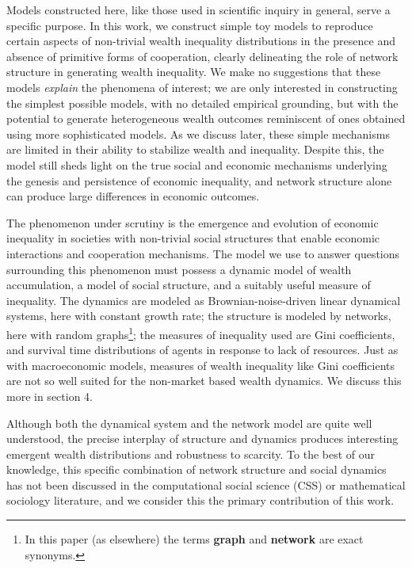 Models constructed here, like those used in scientific inquiry in general, serve a specific purpose. In this work, we construct simple toy models to reproduce certain aspects of non-trivial wealth inequality distributions in the presence and absence of primitive forms of cooperation, clearly delineating the role of network structure in generating wealth inequality. We make no suggestions that these models \textit{explain} the phenomena of interest; we are only interested in constructing the simplest possible models, with no detailed empirical grounding, but with the potential to generate heterogeneous wealth outcomes reminiscent of ones obtained using more sophisticated models. As we discuss later, these simple mechanisms are limited in their ability to stabilize wealth and inequality. Despite this, the model still sheds light on the true social and economic mechanisms underlying the genesis and persistence of economic inequality, and network structure alone can produce large differences in economic outcomes. 


\label{giniKindaSucks}
The phenomenon under scrutiny is the emergence and evolution of economic inequality in societies with non-trivial social structures that enable economic interactions and cooperation mechanisms. The model we use to answer questions surrounding this phenomenon must possess a dynamic model of wealth accumulation, a model of social structure, and a suitably useful measure of inequality. The dynamics are modeled as Brownian-noise-driven linear dynamical systems, here with constant growth rate; the structure is modeled by networks, here with random graphs\footnote{In this paper (as elsewhere) the terms \textbf{graph} and \textbf{network} are exact synonyms.}; the measures of inequality used are Gini coefficients, and survival time distributions of agents in response to lack of resources. Just as with macroeconomic models, measures of wealth inequality like Gini coefficients are not so well suited for the non-market based wealth dynamics. We discuss this more in section 4. 


Although both the dynamical system and the network model are quite well understood, the precise interplay of structure and dynamics produces interesting emergent wealth distributions and robustness to scarcity. To the best of our knowledge, this specific combination of network structure and social dynamics has not been discussed in the computational social science (CSS) or mathematical sociology literature, and we consider this the primary contribution of this work. 

